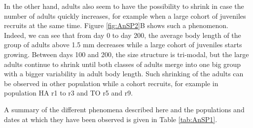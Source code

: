 In the other hand, adults also seem to have the possibility to shrink in case
the number of adults quickly increases, for example when a large cohort of
juveniles recruits at the same time. Figure \ref{fig:AnSP2}B shows such a
phenomenon. Indeed, we can see that from day 0 to day 200, the average body
length of the group of adults above 1.5 mm decreases while a large cohort of
juveniles starts growing.
Between days 100 and 200, the size structure is tri-modal, but the large adults
continue to shrink until both classes of adults merge into one big group with a
bigger variability in adult body length. Such shrinking of the adults can be
observed in other population while a cohort recruits, for example in population
HA r1 to r3 and TO r5 and r9.

A summary of the different phenomena described here and the populations and
dates at which they have been observed is given in Table \ref{tab:AnSP1}.

